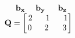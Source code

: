 \documentclass[preview]{standalone}
\begin{document}
\begin{align*}
\begin{array}{ccc}\begin{matrix}\hspace{0.25cm} \mathbf{b_{x}} & \hspace{0.1cm} \mathbf{b_{y}} \hspace{0.1cm}& \hspace{0.1cm} \mathbf{b_{z}} \end{matrix} \\ \mathbf{Q} = \begin{bmatrix} 2 & \hspace{0.1cm} 1 \hspace{0.1cm}& \hspace{0.1cm} 1 \\ \hspace{0.04cm}  0 \hspace{0.1cm} & \hspace{0.1cm} 2 \hspace{0.1cm}\hspace{0.1cm} & 3 \end{bmatrix} \end{array}
\end{align*}
\end{document}
